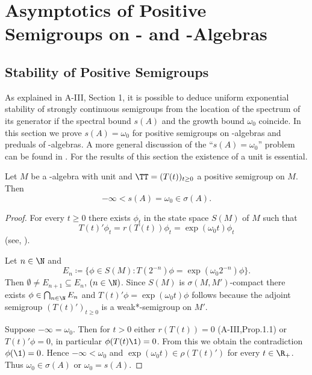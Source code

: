 

\chapter{Asymptotics of Positive Semigroups on \CA- and \WA-Algebras}\label{chap:d4}

\section{Stability of Positive Semigroups}\label{sec:d4-1}

As explained in A-III, Section 1, it is possible to deduce uniform exponential stability of strongly continuous semigroups from the location of the spectrum of its generator if the spectral bound $ s(A) $ and the growth bound $ \omega_{0} $ coincide.
In this section we prove $s(A) = \omega_{0}$ for positive semigroups on \CA-algebras and preduals of \WA-algebras.
A more general discussion of the \enquote{$s(A) = \omega_{0}$} problem can be found in \citet{greinervoigtwolff:1981}.
For the results of this section the existence of a unit is essential.
\begin{theorem}\label{thm:d4-1.1}
Let $M$ be a \CA-algebra with unit and $\TT = (T(t))_{t \geq 0}$ a positive semigroup on $M$.
Then
\[
	-\infty < s(A) = \omega_{0} \in \sigma(A).
\]
\end{theorem}
\begin{proof}
For every  $t \geq 0 $ there exists $\phi_{t}$ in the state space $S(M)$ of $M$ such that
\[
	T(t)'\phi_{t} = r(T(t))\phi_{t} = \exp(\omega_{0} t)\phi_{t}
\]
(see, \eg \citet[2.1]{groh:1981}).

Let $n \in \N$ and
\[
	E_{n} \coloneqq \{\phi \in S(M) \colon T(2^{-n})\phi = \exp(\omega_{0} 2^{-n})\phi \}.
\]
Then $\emptyset \neq E_{n+1} \subseteq E_{n}$,  $(n \in \N)$.
Since $S(M)$ is $\sigma(M,M')$-compact there exists $\phi \in \bigcap_{n \in \N} E_{n}$ and $ T(t)'\phi = \exp(\omega_{0} t)\phi$ follows because the adjoint semigroup $(T(t)')_{t \geq 0}$ is a weak*-semigroup on $M'$.

Suppose $-\infty = \omega_{0}$.
Then for $t > 0$ either $r(T(t)) = 0$ (A-III,Prop.1.1) or $T(t)'\phi = 0$, in particular $\phi(T(t)\1) = 0$.
From this we obtain the contradiction $\phi(\1) = 0$.
Hence $-\infty < \omega_{0}$ and $\exp(\omega_{0} t) \in \rho(T(t)')$ for every $t \in \R_{+}$.
Thus $\omega_{0} \in \sigma(A)$ or $\omega_{0} = s(A)$.
\end{proof}
